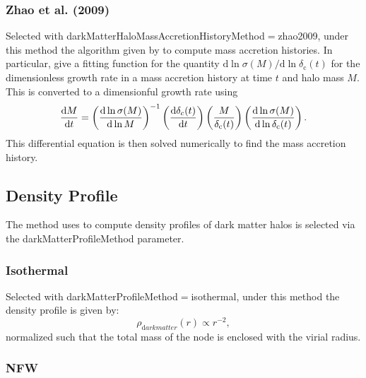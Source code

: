 \subsubsection{Zhao et al. (2009)}

Selected with {\normalfont \ttfamily darkMatterHaloMassAccretionHistoryMethod}$=${\normalfont \ttfamily zhao2009}, under this method the algorithm given by \cite{zhao_accurate_2009} to compute mass accretion histories. In particular, \cite{zhao_accurate_2009} give a fitting function for the quantity ${\mathrm d} \ln \sigma(M)/{\mathrm d} \ln  \delta_{\mathrm c}(t)$ for the dimensionless growth rate in a mass accretion history at time $t$ and halo mass $M$. This is converted to a dimensionful growth rate using
\begin{equation}
 {{\mathrm d} M \over {\mathrm d} t} = \left({{\mathrm d} \ln \sigma(M) \over {\mathrm d} \ln M}\right)^{-1} \left({{\mathrm d} \delta_c(t) \over {\mathrm d} t}\right) \left( {M \over \delta_{\mathrm c}(t)} \right) \left({{\mathrm d} \ln \sigma(M) \over {\mathrm d} \ln \delta_{\mathrm c}(t)}\right).
\end{equation}
This differential equation is then solved numerically to find the mass accretion history.

\subsection{Density Profile}

The method uses to compute density profiles of dark matter halos is selected via the {\normalfont \ttfamily darkMatterProfileMethod} parameter.

\subsubsection{Isothermal}

Selected with {\normalfont \ttfamily darkMatterProfileMethod}$=${\normalfont \ttfamily isothermal}, under this method the density profile is given by:
\begin{equation}
 \rho_{\mathrm dark matter}(r) \propto r^{-2},
\end{equation}
normalized such that the total mass of the \gls{node} is enclosed with the virial radius.

\subsubsection{NFW}


